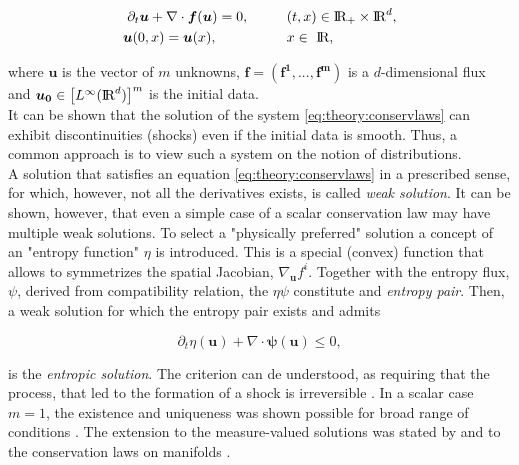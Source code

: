 \documentclass[11pt,a4paper,headinclude=true,DIV=14,BCOR=8mm,chapterprefix,listof=totoc,twoside,openright,abstracton]{scrbook}
\begin{document}
\begin{align} 
\partial_t\boldsymbol{u} + \nabla\cdot\boldsymbol{f}(\boldsymbol{u}) = 0, \hspace{10mm} &(t,x)\in \text{I\!R}_{+}\times\text{I\!R}^d , \\
\boldsymbol{u}(0, x) = \boldsymbol{u}(x), \hspace{18mm} &x\in \text{ I\!R},
\label{eq:theory:conservlaws}
\end{align}

where $\boldsymbol{u}$ is the vector of $m$ unknowns, $\boldsymbol{f}=(\boldsymbol{\boldsymbol{f}^1,...,\boldsymbol{f}^m})$ is a $d$-dimensional flux and $\boldsymbol{u_0}\in\big[L^{\infty}(\text{I\!R}^d)\big]^m$ is the initial data. \\

It can be shown that the solution of the system \ref{eq:theory:conservlaws} can exhibit discontinuities (shocks) even if the initial data is smooth. Thus, a common approach is to view such a system on the notion of distributions. \\

A solution that satisfies an equation \ref{eq:theory:conservlaws} in a prescribed sense, for which, however, not all the derivatives exists, is called \textit{weak solution}. It can be shown, however, that even a simple case of a scalar conservation law may have multiple weak solutions. To select a "physically preferred" solution a concept of an "entropy function" $\eta$ is introduced. This is a special (convex) function that allows to symmetrizes the spatial Jacobian, $\nabla_{\boldsymbol{u}}f^i$. Together with the entropy flux, $\psi$, derived from compatibility relation, the $\eta\psi$ constitute and \textit{entropy pair}. Then, a weak solution for which the entropy pair exists and admits

\begin{equation}
\partial_t\eta(\boldsymbol{u}) + \nabla\cdot\boldsymbol{\psi}(\boldsymbol{u})\leq 0,
\label{eq:theory:nummeth:entropic}
\end{equation}

is the \textit{entropic solution}. The criterion can de understood, as requiring that the process, that led to the formation of a shock is irreversible \cite{LeVeque:1992}. In a scalar case $m=1$, the existence and uniqueness was shown possible for broad range of conditions \cite{Kruzkov:1970}. The extension to the  measure-valued solutions was stated by \cite{DiPerna:1985} and to the conservation laws on manifolds \cite{Benartzi:2007}. \\
\end{document}
